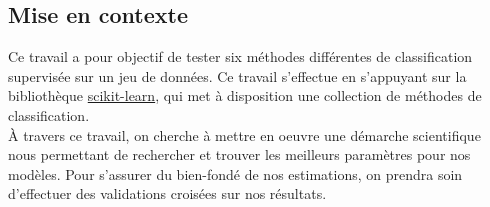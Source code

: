 \subsection{Mise en contexte}

Ce travail a pour objectif de tester six méthodes différentes de classification supervisée sur un jeu de données. Ce travail s'effectue en s'appuyant sur la bibliothèque \href{https://scikit-learn.org/stable/supervised_learning.html}{scikit-learn}, qui met à disposition une collection de méthodes de classification.\\

À travers ce travail, on cherche à mettre en oeuvre une démarche scientifique nous permettant de rechercher et trouver les meilleurs paramètres pour nos modèles. Pour s'assurer du bien-fondé de nos estimations, on prendra soin d'effectuer des validations croisées sur nos résultats.
